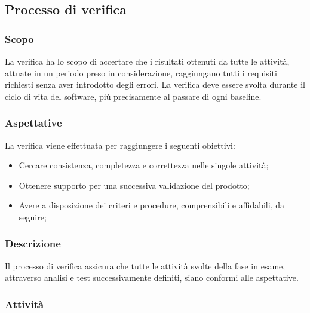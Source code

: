 \subsection{Processo di verifica}
\subsubsection{Scopo}
La verifica ha lo scopo di accertare che i risultati ottenuti da tutte le attività, attuate in un periodo preso in considerazione, raggiungano tutti i requisiti richiesti senza aver introdotto degli errori. La verifica deve essere svolta durante il ciclo di vita del software, più precisamente al passare di ogni baseline\glo.
\subsubsection{Aspettative}
La verifica viene effettuata per raggiungere i seguenti obiettivi:
\begin{itemize}
	\item Cercare consistenza, completezza e correttezza nelle singole attività;
	\item Ottenere supporto per una successiva validazione del prodotto;
	\item Avere a disposizione dei criteri e procedure, comprensibili e affidabili, da seguire;
\end{itemize}
\subsubsection{Descrizione}
Il processo di verifica assicura che tutte le attività svolte della fase in esame, attraverso analisi e test successivamente definiti, siano conformi alle aspettative.
\subsubsection{Attività}

